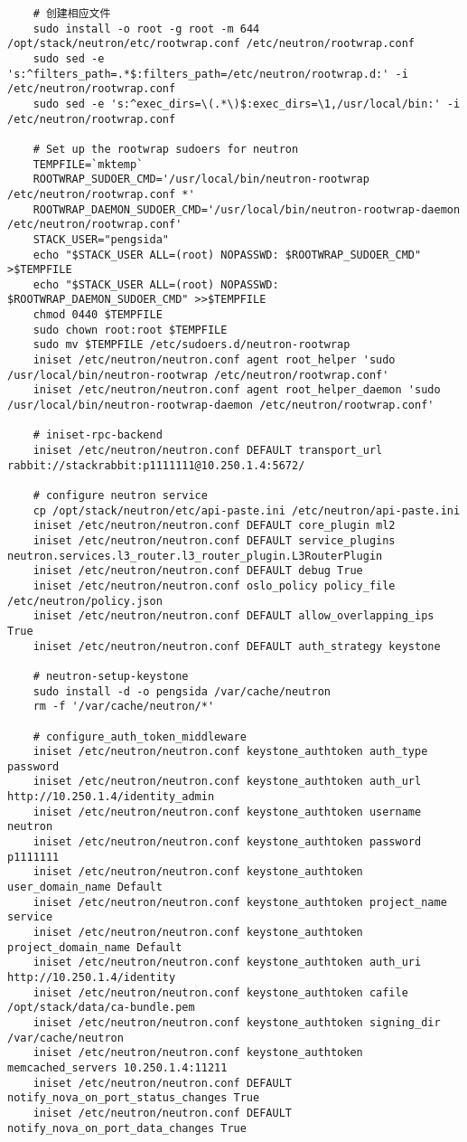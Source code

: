 \documentclass[a4paper,left=1.5cm,right=1.5cm,11pt]{article}
\begin{document}
\begin{lstlisting}
	# 创建相应文件
	sudo install -o root -g root -m 644 /opt/stack/neutron/etc/rootwrap.conf /etc/neutron/rootwrap.conf
	sudo sed -e 's:^filters_path=.*$:filters_path=/etc/neutron/rootwrap.d:' -i /etc/neutron/rootwrap.conf
	sudo sed -e 's:^exec_dirs=\(.*\)$:exec_dirs=\1,/usr/local/bin:' -i /etc/neutron/rootwrap.conf

	# Set up the rootwrap sudoers for neutron
	TEMPFILE=`mktemp`
	ROOTWRAP_SUDOER_CMD='/usr/local/bin/neutron-rootwrap /etc/neutron/rootwrap.conf *'
	ROOTWRAP_DAEMON_SUDOER_CMD='/usr/local/bin/neutron-rootwrap-daemon /etc/neutron/rootwrap.conf'
	STACK_USER="pengsida"
	echo "$STACK_USER ALL=(root) NOPASSWD: $ROOTWRAP_SUDOER_CMD" >$TEMPFILE
    echo "$STACK_USER ALL=(root) NOPASSWD: $ROOTWRAP_DAEMON_SUDOER_CMD" >>$TEMPFILE
    chmod 0440 $TEMPFILE
    sudo chown root:root $TEMPFILE
    sudo mv $TEMPFILE /etc/sudoers.d/neutron-rootwrap
	iniset /etc/neutron/neutron.conf agent root_helper 'sudo /usr/local/bin/neutron-rootwrap /etc/neutron/rootwrap.conf'
	iniset /etc/neutron/neutron.conf agent root_helper_daemon 'sudo /usr/local/bin/neutron-rootwrap-daemon /etc/neutron/rootwrap.conf'

	# iniset-rpc-backend
	iniset /etc/neutron/neutron.conf DEFAULT transport_url rabbit://stackrabbit:p1111111@10.250.1.4:5672/

	# configure neutron service
	cp /opt/stack/neutron/etc/api-paste.ini /etc/neutron/api-paste.ini
	iniset /etc/neutron/neutron.conf DEFAULT core_plugin ml2
	iniset /etc/neutron/neutron.conf DEFAULT service_plugins neutron.services.l3_router.l3_router_plugin.L3RouterPlugin
	iniset /etc/neutron/neutron.conf DEFAULT debug True
	iniset /etc/neutron/neutron.conf oslo_policy policy_file /etc/neutron/policy.json
	iniset /etc/neutron/neutron.conf DEFAULT allow_overlapping_ips True
	iniset /etc/neutron/neutron.conf DEFAULT auth_strategy keystone

	# neutron-setup-keystone
	sudo install -d -o pengsida /var/cache/neutron
	rm -f '/var/cache/neutron/*'

	# configure_auth_token_middleware
	iniset /etc/neutron/neutron.conf keystone_authtoken auth_type password
	iniset /etc/neutron/neutron.conf keystone_authtoken auth_url http://10.250.1.4/identity_admin
	iniset /etc/neutron/neutron.conf keystone_authtoken username neutron
	iniset /etc/neutron/neutron.conf keystone_authtoken password p1111111
	iniset /etc/neutron/neutron.conf keystone_authtoken user_domain_name Default
	iniset /etc/neutron/neutron.conf keystone_authtoken project_name service
	iniset /etc/neutron/neutron.conf keystone_authtoken project_domain_name Default
	iniset /etc/neutron/neutron.conf keystone_authtoken auth_uri http://10.250.1.4/identity
	iniset /etc/neutron/neutron.conf keystone_authtoken cafile /opt/stack/data/ca-bundle.pem
	iniset /etc/neutron/neutron.conf keystone_authtoken signing_dir /var/cache/neutron
	iniset /etc/neutron/neutron.conf keystone_authtoken memcached_servers 10.250.1.4:11211
	iniset /etc/neutron/neutron.conf DEFAULT notify_nova_on_port_status_changes True
	iniset /etc/neutron/neutron.conf DEFAULT notify_nova_on_port_data_changes True


\end{lstlisting}
\end{document}
